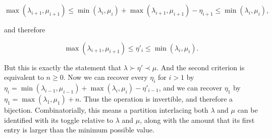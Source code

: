 $$
	\max(\lambda_{i + 1}, \mu_{i + 1}) \leq \min(\lambda_i, \mu_i) + \max(\lambda_{i + 1}, \mu_{i + 1}) - \eta_{i + 1} \leq \min(\lambda_i, \mu_i),
$$

and therefore

$$
	\max(\lambda_{i + 1}, \mu_{i + 1}) \leq \eta'_i \leq \min(\lambda_i, \mu_i).
$$

But this is exactly the statement that $\lambda \succ \eta' \prec \mu$. And the second criterion is equivalent to $n \geq 0$. Now we can recover every $\eta_i$ for $i > 1$ by $\eta_i = \min(\lambda_{i - 1}, \mu_{i - 1}) + \max(\lambda_i, \mu_i) - \eta'_{i - 1}$, and we can recover $\eta_1$ by $\eta_1 = \max(\lambda_1, \mu_1) + n$. Thus the operation is invertible, and therefore a bijection. Combinatorially, this means a partition interlacing both $\lambda$ and $\mu$ can be identified with its toggle relative to $\lambda$ and $\mu$, along with the amount that its first entry is larger than the minimum possible value.


